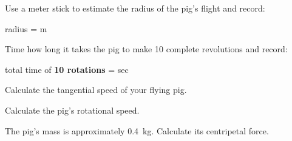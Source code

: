 \documentclass[10pt]{exam}
\begin{document}
\begin{questions}
\question
  Use a meter stick to estimate the radius of the pig's flight and record: 

  \vspace{1em}

  radius = \fillin[][6em] m

  \vspace{1em}

\question
  Time how long it takes the pig to make 10 complete revolutions and record: 

  \vspace{1em}
  
  total time of {\bf 10 rotations} = \fillin[][6em] sec

  \vspace{1em}

\question
  Calculate the tangential speed of your flying pig.  
  \vs[2]

\question
  Calculate the pig's rotational speed.
  \vs

\question
  The pig's mass is approximately 0.4~kg.  Calculate its centripetal force.
  \vs


  


\end{questions}
\end{document}
